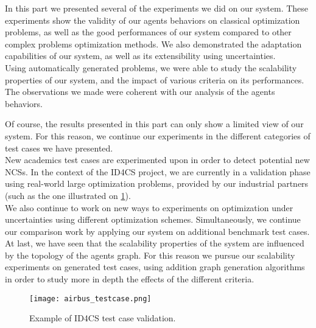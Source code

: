 In this part we presented several of the experiments we did on our system. These experiments show the validity of our agents behaviors on classical optimization problems, as well as the good performances of our system compared to other complex problems optimization methods. We also demonstrated the adaptation capabilities of our system, as well as its extensibility using uncertainties.\\
Using automatically generated problems, we were able to study the scalability properties of our system, and the impact of various criteria on its performances. The observations we made were coherent with our analysis of the agents behaviors.

Of course, the results presented in this part can only show a limited view of our system. For this reason, we continue our experiments in the different categories of test cases we have presented.\\
New academics test cases are experimented upon in order to detect potential new NCSs. In the context of the ID4CS project, we are currently in a validation phase using real-world large optimization problems, provided by our industrial partners (such as the one illustrated on \figurename{} \ref{test_case_airbus}).\\
We also continue to work on new ways to experiments on optimization under uncertainties using different optimization schemes. Simultaneously, we continue our comparison work by applying our system on additional benchmark test cases.\\
At last, we have seen that the scalability properties of the system are influenced by the topology of the agents graph. For this reason we pursue our scalability experiments on generated test cases, using addition graph generation algorithms in order to study more in depth the effects of the different criteria.

\begin{figure}[b]
\centering
\texttt{[image: airbus\_testcase.png]}
\caption{Example of ID4CS test case validation.}\label{test_case_airbus}
\end{figure}